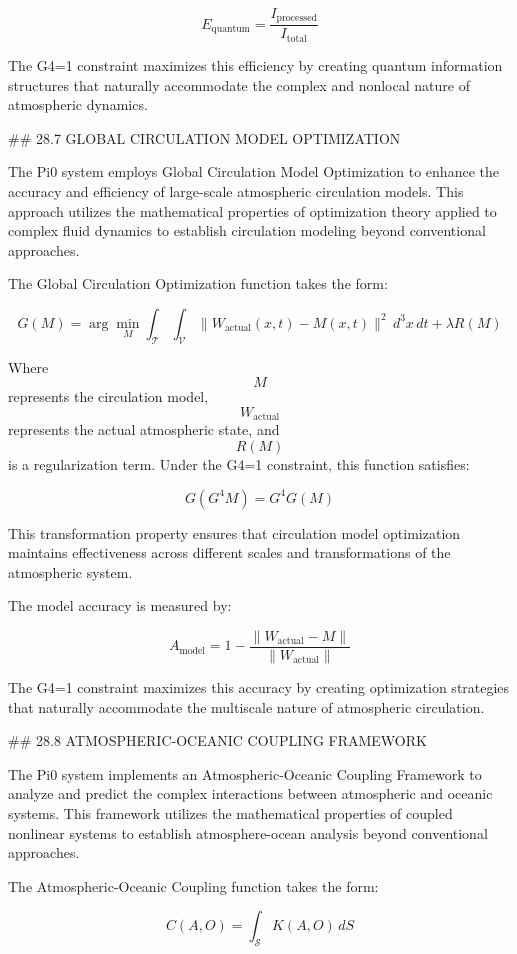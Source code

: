 $$ E_{\text{quantum}} = \frac{I_{\text{processed}}}{I_{\text{total}}} $$

The G4=1 constraint maximizes this efficiency by creating quantum information structures that naturally accommodate the complex and nonlocal nature of atmospheric dynamics.

## 28.7 GLOBAL CIRCULATION MODEL OPTIMIZATION

The Pi0 system employs Global Circulation Model Optimization to enhance the accuracy and efficiency of large-scale atmospheric circulation models. This approach utilizes the mathematical properties of optimization theory applied to complex fluid dynamics to establish circulation modeling beyond conventional approaches.

The Global Circulation Optimization function takes the form:

$$ G(M) = \arg\min_M \int_{\mathcal{T}} \int_{\mathcal{V}} \|W_{\text{actual}}(x, t) - M(x, t)\|^2 \, d^3x \, dt + \lambda R(M) $$

Where $$ M $$ represents the circulation model, $$ W_{\text{actual}} $$ represents the actual atmospheric state, and $$ R(M) $$ is a regularization term. Under the G4=1 constraint, this function satisfies:

$$ G(G^4 M) = G^4 G(M) $$

This transformation property ensures that circulation model optimization maintains effectiveness across different scales and transformations of the atmospheric system.

The model accuracy is measured by:

$$ A_{\text{model}} = 1 - \frac{\|W_{\text{actual}} - M\|}{\|W_{\text{actual}}\|} $$

The G4=1 constraint maximizes this accuracy by creating optimization strategies that naturally accommodate the multiscale nature of atmospheric circulation.

## 28.8 ATMOSPHERIC-OCEANIC COUPLING FRAMEWORK

The Pi0 system implements an Atmospheric-Oceanic Coupling Framework to analyze and predict the complex interactions between atmospheric and oceanic systems. This framework utilizes the mathematical properties of coupled nonlinear systems to establish atmosphere-ocean analysis beyond conventional approaches.

The Atmospheric-Oceanic Coupling function takes the form:

$$ C(A, O) = \int_{\mathcal{S}} K(A, O) \, dS $$


